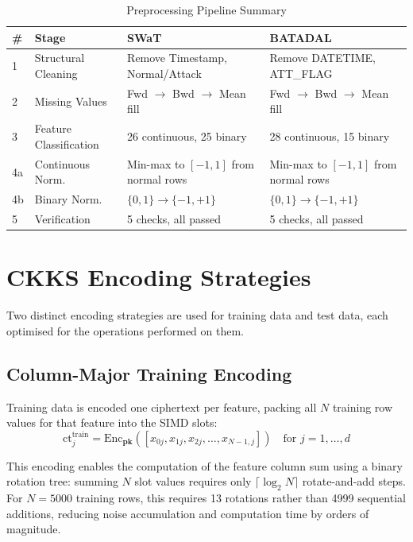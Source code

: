\begin{table}[H]
\centering
\caption{Preprocessing Pipeline Summary}
\label{tab:preproc}
\begin{tabular}{p{0.5cm}p{3.5cm}p{4.5cm}p{4.5cm}}
\toprule
\textbf{\#} & \textbf{Stage} & \textbf{SWaT} & \textbf{BATADAL} \\
\midrule
1 & Structural Cleaning & Remove Timestamp, Normal/Attack & Remove DATETIME, ATT\_FLAG \\
2 & Missing Values & Fwd $\to$ Bwd $\to$ Mean fill & Fwd $\to$ Bwd $\to$ Mean fill \\
3 & Feature Classification & 26 continuous, 25 binary & 28 continuous, 15 binary \\
4a & Continuous Norm. & Min-max to $[-1,1]$ from normal rows & Min-max to $[-1,1]$ from normal rows \\
4b & Binary Norm. & $\{0,1\} \to \{-1,+1\}$ & $\{0,1\} \to \{-1,+1\}$ \\
5 & Verification & 5 checks, all passed & 5 checks, all passed \\
\bottomrule
\end{tabular}
\end{table}

\section{CKKS Encoding Strategies}

Two distinct encoding strategies are used for training data and test data,
each optimised for the operations performed on them.

\subsection{Column-Major Training Encoding}

Training data is encoded one ciphertext per feature, packing all $N$ training
row values for that feature into the SIMD slots:
\begin{equation}
  \mathrm{ct}_j^{\text{train}} = \mathrm{Enc}_\mathbf{pk}
  ([x_{0j}, x_{1j}, x_{2j}, \ldots, x_{N-1,j}])
  \quad \text{for } j = 1, \ldots, d
  \label{eq:colmajor}
\end{equation}

This encoding enables the computation of the feature column sum using a
binary rotation tree: summing $N$ slot values requires only $\lceil\log_2 N
\rceil$ rotate-and-add steps. For $N = 5000$ training rows, this requires 13
rotations rather than 4999 sequential additions, reducing noise accumulation
and computation time by orders of magnitude.

